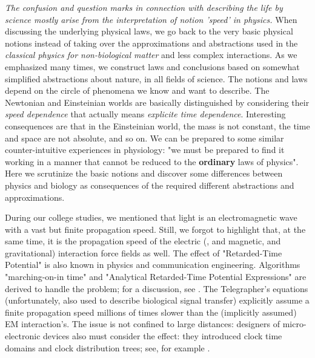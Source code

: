 \textit{The confusion and question marks in connection with describing the life by science mostly arise from the interpretation of
	notion 'speed' in physics.}
When discussing the underlying physical laws, we
go back to the very basic physical notions instead of taking over the
approximations and abstractions
used in the \textit{classical physics for non-biological matter} and
less complex interactions.
As we emphasized many times, we construct laws and conclusions based
on somewhat simplified abstractions about nature, in all fields of science.
The notions and laws depend
on the circle of phenomena we know and want to describe.
The Newtonian and Einsteinian worlds are
basically distinguished by considering their \textit{speed dependence} that actually means \textit{explicite time dependence}.
Interesting consequences are that in the Einsteinian world,
the mass is not constant, the time and space are not absolute, and so on.
We can be prepared to some similar counter-intuitive experiences in physiology: "we must be prepared to find it working in a manner that cannot be reduced to the \textbf{ordinary} laws of physics"\cite{Schrodinger:1992}.
Here we scrutinize the basic notions and discover some differences
between physics and biology
as consequences of the required different abstractions and approximations.



During our college studies, we mentioned that light is an electromagnetic
wave with a vast but finite propagation speed. Still, we forgot to
highlight that, at the same time, it is the propagation speed of the
electric (, and magnetic, and gravitational) interaction force fields
as well. The effect of "Retarded-Time Potential" is also known
in physics and communication engineering. Algorithms "marching-on-in
time" and "Analytical Retarded-Time Potential Expressions" are
derived to handle the problem; for a discussion, see \cite{RetardedTimePotential:2011}.
The Telegrapher's equations (unfortunately, also used to describe biological signal transfer)
explicitly assume a finite propagation speed millions of times slower
than the (implicitly assumed) \gls{EM} 
interaction's. The issue is not confined to large
distances: designers of micro-electronic devices also must consider
the effect: they introduced clock time domains and clock distribution
trees; see, for example \cite{WiringDominance:2019, VeghRevisingClassicComputing:2021}.


